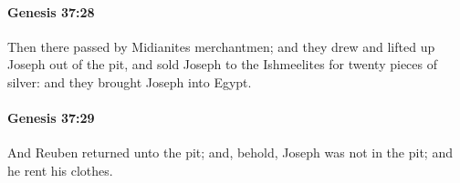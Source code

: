 		\paragraph{Genesis 37:28} %
			\label{GENESIS-37-28}

			Then there passed by Midianites merchantmen; and they drew and lifted up Joseph out of the pit, and sold Joseph to the Ishmeelites for twenty pieces of silver: and they brought Joseph into Egypt.


		\paragraph{Genesis 37:29} %
			\label{GENESIS-37-29}

			And Reuben returned unto the pit; and, behold, Joseph was not in the pit; and he rent his clothes.


